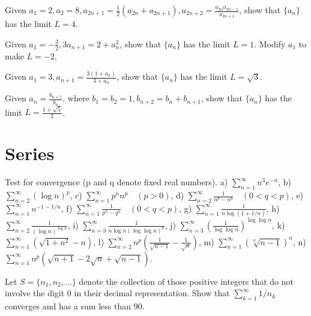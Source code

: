 \begin{problembox}
Given \(a_1 = 2, a_2 = 8, a_{2n+1} = \frac{1}{2}(a_{2n} + a_{2n+1}), a_{2n+2} = \frac{a_{2n} a_{2n-1}}{a_{2n+1}}\), show that \(\{a_n\}\) has the limit \(L = 4\).
\end{problembox}

\begin{problembox}
Given \(a_1 = -\frac{3}{2}, 3a_{n+1} = 2 + a_n^3\), show that \(\{a_n\}\) has the limit \(L = 1\). Modify \(a_1\) to make \(L = -2\).
\end{problembox}

\begin{problembox}
Given \(a_1 = 3, a_{n+1} = \frac{3(1 + a_n)}{3 + a_n}\), show that \(\{a_n\}\) has the limit \(L = \sqrt{3}\).
\end{problembox}

\begin{problembox}
Given \(a_n = \frac{b_{n+1}}{b_n}\), where \(b_1 = b_2 = 1, b_{n+2} = b_n + b_{n+1}\), show that \(\{a_n\}\) has the limit \(L = \frac{1 + \sqrt{5}}{2}\).
\end{problembox}

\section{Series}

\begin{problembox}
Test for convergence (p and q denote fixed real numbers).
a) \(\sum_{n=1}^{\infty} n^3 e^{-n}\),    b) \(\sum_{n=2}^{\infty} (\log n)^p\), 
c) \(\sum_{n=1}^{\infty} p^n n^p \quad (p > 0)\),    d) \(\sum_{n=2}^{\infty} \frac{1}{n^p - n^q} \quad (0 < q < p)\),
e) \(\sum_{n=1}^{\infty} n^{-1-1/n}\),    f) \(\sum_{n=1}^{\infty} \frac{1}{p^n - q^n} \quad (0 < q < p)\),
g) \(\sum_{n=1}^{\infty} \frac{1}{n \log (1 + 1/n)}\),    h) \(\sum_{n=2}^{\infty} \frac{1}{(\log n)^{\log n}}\),
i) \(\sum_{n=3}^{\infty} \frac{1}{n \log n (\log \log n)^p}\),    j) \(\sum_{n=3}^{\infty} \left( \frac{1}{\log \log n} \right)^{\log \log n}\),
k) \(\sum_{n=1}^{\infty} (\sqrt{1 + n^2} - n)\),    l) \(\sum_{n=2}^{\infty} n^p \left( \frac{1}{\sqrt{n - 1}} - \frac{1}{\sqrt{n}} \right)\),
m) \(\sum_{n=1}^{\infty} (\sqrt[n]{n - 1})^n\),    n) \(\sum_{n=1}^{\infty} n^p (\sqrt{n + 1} - 2\sqrt{n} + \sqrt{n - 1})\).
\end{problembox}

\begin{problembox}
Let \(S = \{n_1, n_2, \ldots\}\) denote the collection of those positive integers that do not involve the digit 0 in their decimal representation. Show that \(\sum_{k=1}^{\infty} 1/n_k\) converges and has a sum less than 90.
\end{problembox}

